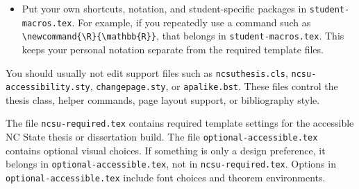 \begin{dedication}
\begin{itemize}
  \item Put your own shortcuts, notation, and student-specific packages in \texttt{student-macros.tex}. For example, if you repeatedly use a command such as \texttt{\textbackslash newcommand\{\textbackslash R\}\{\textbackslash mathbb\{R\}\}}, that belongs in \texttt{student-macros.tex}. This keeps your personal notation separate from the required template files.
\end{itemize}

You should usually not edit support files such as \texttt{ncsuthesis.cls}, \texttt{ncsu-accessibility.sty}, \texttt{changepage.sty}, or \texttt{apalike.bst}. These files control the thesis class, helper commands, page layout support, or bibliography style.

The file \texttt{ncsu-required.tex} contains required template settings for the accessible NC State thesis or dissertation build. The file \texttt{optional-accessible.tex} contains optional visual choices. If something is only a design preference, it belongs in \texttt{optional-accessible.tex}, not in \texttt{ncsu-required.tex}. Options in \texttt{optional-accessible.tex} include font choices and theorem environments.

\end{dedication}

